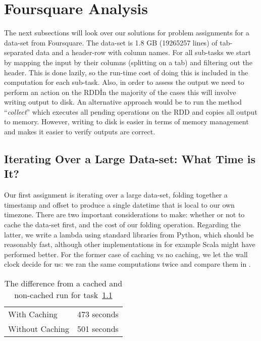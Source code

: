 \section{Foursquare Analysis}\label{ref:foursquare}
The next subsections will look over our solutions for problem assignments for a data-set from Foursquare. The data-set is 1.8 GB (19265257 lines) of tab-separated data and a header-row with column names. For all sub-tasks we start by mapping the input by their columns (splitting on a tab) and filtering out the header. This is done lazily, so the run-time cost of doing this is included in the computation for each sub-task. Also, in order to assess the output 
we need to perform an action on the RDD\.  In the majority of the cases this will involve writing 
output to disk. An alternative approach would be to run the method ``\textit{collect}'' which executes all pending operations on the RDD and copies all output to memory. However, writing to disk is easier in terms of memory management and makes it easier to verify outputs are correct.


\subsection{Iterating Over a Large Data-set: What Time is It?}\label{sec:iterate}
Our first assignment is iterating over a large data-set, folding together a timestamp and offset to produce a single datetime that is local to our own timezone. There are two important considerations to make: whether or not to cache the data-set first, and the cost of our folding operation. Regarding the latter, we write a lambda using standard libraries from Python, which should be reasonably fast, although other implementations in for example Scala might have performed better. 
For the former case of caching vs no caching, we let the wall clock decide for us: we ran the same
computations twice and compare them in . 

\begin{table}[Hb]
\centering
\begin{tabular}{p{}|p{}}
        With Caching & 473 seconds \\
        Without Caching & 501 seconds\\
    \end{tabular}
    \caption{The difference from a cached and non-cached run for task~\ref{sec:iterate}}
\label{tab:cacheVsNoCacheFold}
\end{table}

